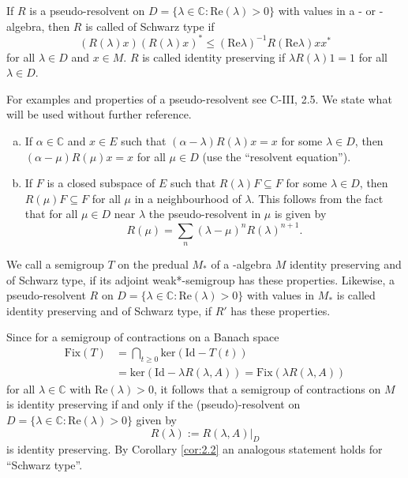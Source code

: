 
If $ R $ is a pseudo-resolvent on $ D = \{\lambda \in \mathbb{C} : \text{Re}(\lambda) > 0\} $ with values in a \CA- or \WA-algebra, then $ R $ is called of Schwarz type if
\[
(R(\lambda)x)(R(\lambda)x)^{*} \leq (\text{Re}\lambda)^{-1} R(\text{Re}\lambda)xx^{*}
\]
for all $ \lambda \in D $ and $ x \in M $.
$ R $ is called identity preserving if $ \lambda R(\lambda)1 = 1 $ for all $ \lambda \in D $.

For examples and properties of a pseudo-resolvent see C-III, 2.5.
We state what will be used without further reference.

\begin{enumerate}[(a)]
\item 
If $ \alpha \in \mathbb{C} $ and $ x \in E $ such that $ (\alpha - \lambda)R(\lambda)x = x $ for some $ \lambda \in D $, then $ (\alpha - \mu)R(\mu)x = x $ for all $ \mu \in D $ (use the \enquote{resolvent equation}).

\item 
If $ F $ is a closed subspace of $ E $ such that $ R(\lambda)F \subseteq F $ for some $ \lambda \in D $, then $ R(\mu)F \subseteq F $ for all $ \mu $ in a neighbourhood of $ \lambda $.
This follows from the fact that for all $ \mu \in D $ near $ \lambda $ the pseudo-resolvent in $ \mu $ is given by
\[
R(\mu) = \sum_{n} (\lambda - \mu)^{n} R(\lambda)^{n+1}.
\]
\end{enumerate}

\begin{definition}\label{def:2.4}
We call a semigroup $ T $ on the predual $ M_{*} $ of a \WA-algebra $ M $ identity preserving and of Schwarz type, if its adjoint weak*-semigroup has these properties.
Likewise, a pseudo-resolvent $ R $ on $ D = \{\lambda \in \mathbb{C} : \text{Re}(\lambda) > 0\} $ with values in $ M_{*} $ is called identity preserving and of Schwarz type, if $ R' $ has these properties.
\end{definition}

Since for a semigroup of contractions on a Banach space
\begin{align*}
	\text{Fix}(T) &= \bigcap_{t \geq 0} \text{ker}(\text{Id} - T(t)) \\
	& = \text{ker}(\text{Id} - \lambda R(\lambda,A)) = \text{Fix}(\lambda R(\lambda,A))	
\end{align*}
for all $ \lambda \in \mathbb{C} $ with $ \text{Re}(\lambda) > 0 $, it follows that a semigroup of contractions on $ M $ is identity preserving if and only if the (pseudo)-resolvent on $ D = \{\lambda \in \mathbb{C} : \text{Re}(\lambda) > 0\} $ given by
\[
R(\lambda) := R(\lambda,A)|_{D}
\]
is identity preserving.
By Corollary \ref{cor:2.2} an analogous statement holds for \enquote{Schwarz type}.

